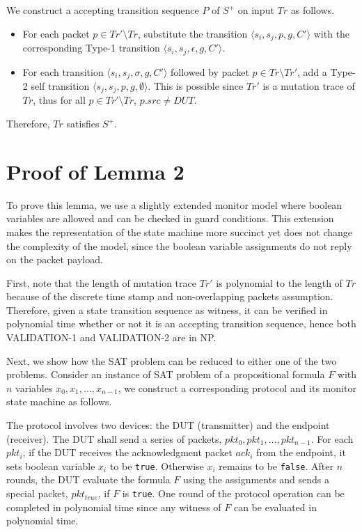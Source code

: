 We construct a accepting transition sequence $P$ of $S^+$ on input $Tr$ as
follows.
\begin{itemize}
  \item For each packet $p \in Tr' \setminus Tr$, substitute the transition
    $\langle s_i, s_j, p, g, C'\rangle$ with the corresponding Type-1
    transition $\langle s_i, s_j, \epsilon, g, C'\rangle$.
  \item For each transition $\langle s_i, s_j, \sigma, g, C'\rangle$
    followed by packet $p \in Tr\setminus Tr'$, add a Type-2 self
    transition $\langle s_j, s_j, p, g, \emptyset\rangle$. This is
    possible since $Tr'$ is a mutation trace of $Tr$, thus  for all $p \in Tr'
    \setminus Tr$, $p.src \ne DUT$.
\end{itemize}
Therefore, $Tr$ satisfies $S^+$.

\section{Proof of Lemma 2}
\label{app:lemma2}

To prove this lemma, we use a slightly extended monitor model where boolean
variables are allowed and can be checked in guard conditions. This extension
makes the representation of the state machine more succinct yet does not change
the complexity of the model, since the boolean variable assignments do not reply
on the packet payload.

First, note that the length of mutation trace $Tr'$ is polynomial to the
length of $Tr$ because of the discrete time stamp and non-overlapping packets
assumption.
%
Therefore, given a state transition sequence as witness, it can be verified in
polynomial time whether or not it is an accepting transition sequence, hence
both VALIDATION-1 and VALIDATION-2 are in NP.

Next, we show how the SAT problem can be reduced to either one of the two
problems.
%
Consider an instance of SAT problem of a propositional formula $F$ with $n$
variables $x_0,x_1,\ldots, x_{n-1}$, we construct a corresponding protocol and
its monitor state machine as follows.

The protocol involves two devices: the DUT (transmitter) and the endpoint
(receiver).
%
The DUT shall send a series of packets, $pkt_0, pkt_1,\ldots, pkt_{n-1}$.
%
For each $pkt_i$, if the DUT receives the
acknowledgment packet $ack_i$ from the endpoint, it sets boolean variable
$x_i$ to be \texttt{true}.
%
Otherwise $x_i$ remains to be \texttt{false}.
%
After $n$ rounds, the DUT evaluate the formula $F$ using the assignments and
sends a special packet, $pkt_{true}$, if $F$ is \texttt{true}.
%
One round of the protocol operation can be completed in polynomial time since
any witness of $F$ can be evaluated in polynomial time.

